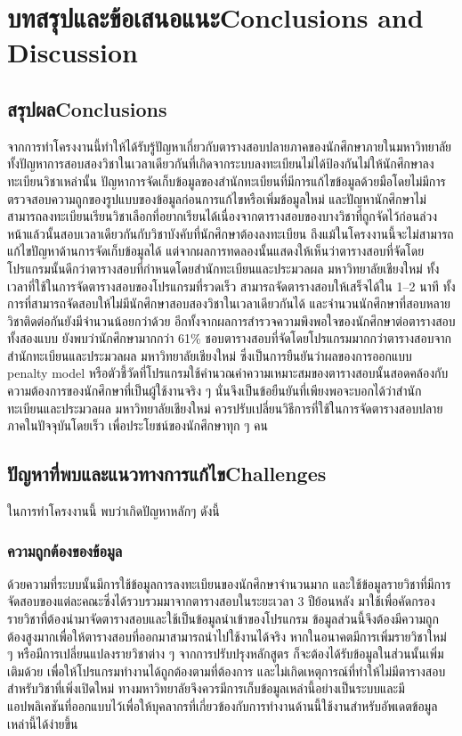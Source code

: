 \chapter{\ifcpe บทสรุปและข้อเสนอแนะ\else Conclusions and Discussion\fi}

\section{\ifcpe สรุปผล\else Conclusions\fi}

จากการทำโครงงานนี้ทำให้ได้รับรู้ปัญหาเกี่ยวกับตารางสอบปลายภาคของนักศึกษาภายในมหาวิทยาลัย
ทั้งปัญหาการสอบสองวิชาในเวลาเดียวกันที่เกิดจากระบบลงทะเบียนไม่ได้ป้องกันไม่ให้นักศึกษาลงทะเบียนวิชาเหล่านั้น
ปัญหาการจัดเก็บข้อมูลของสำนักทะเบียนที่มีการแก้ไขข้อมูลด้วยมือโดยไม่มีการตรวจสอบความถูกของรูปแบบของข้อมูลก่อนการแก้ไขหรือเพิ่มข้อมูลใหม่
และปัญหานักศึกษาไม่สามารถลงทะเบียนเรียนวิชาเลือกที่อยากเรียนได้เนื่องจากตารางสอบของบางวิชาที่ถูกจัดไว้ก่อนล่วงหน้าแล้วนั้นสอบเวลาเดียวกันกับวิชาบังคับที่นักศึกษาต้องลงทะเบียน
ถึงแม้ในโครงงานนี้จะไม่สามารถแก้ไขปัญหาด้านการจัดเก็บข้อมูลได้ แต่จากผลการทดลองนั้นแสดงให้เห็นว่าตารางสอบที่จัดโดยโปรแกรมนั้นดีกว่าตารางสอบที่กำหนดโดยสำนักทะเบียนและประมวลผล มหาวิทยาลัยเชียงใหม่
ทั้งเวลาที่ใช้ในการจัดตารางสอบของโปรแกรมที่รวดเร็ว สามารถจัดตารางสอบให้เสร็จได้ใน 1--2 นาที ทั้งการที่สามารถจัดสอบให้ไม่มีนักศึกษาสอบสองวิชาในเวลาเดียวกันได้
และจำนวนนักศึกษาที่สอบหลายวิชาติดต่อกันยังมีจำนวนน้อยกว่าด้วย อีกทั้งจากผลการสำรวจความพึงพอใจของนักศึกษาต่อตารางสอบทั้งสองแบบ ยังพบว่านักศึกษามากกว่า 61\%
ชอบตารางสอบที่จัดโดยโปรแกรมมากกว่าตารางสอบจากสำนักทะเบียนและประมวลผล มหาวิทยาลัยเชียงใหม่ ซึ่งเป็นการยืนยันว่าผลของการออกแบบ penalty model
หรือตัวชี้วัดที่โปรแกรมใช้คำนวณค่าความเหมาะสมของตารางสอบนั้นสอดคล้องกับความต้องการของนักศึกษาที่เป็นผู้ใช้งานจริง ๆ นั่นจึงเป็นข้อยืนยันที่เพียงพอจะบอกได้ว่าสำนักทะเบียนและประมวลผล มหาวิทยาลัยเชียงใหม่
ควรปรับเปลี่ยนวิธีการที่ใช้ในการจัดตารางสอบปลายภาคในปัจจุบันโดยเร็ว เพื่อประโยชน์ของนักศึกษาทุก ๆ คน

\section{\ifcpe ปัญหาที่พบและแนวทางการแก้ไข\else Challenges\fi}

ในการทำโครงงานนี้ พบว่าเกิดปัญหาหลักๆ ดังนี้
\subsection{ความถูกต้องของข้อมูล}
ด้วยความที่ระบบนั้นมีการใช้ข้อมูลการลงทะเบียนของนักศึกษาจำนวนมาก และใช้ข้อมูลรายวิชาที่มีการจัดสอบของแต่ละคณะซึ่งได้รวบรวมมาจากตารางสอบในระยะเวลา 3 ปีย้อนหลัง 
มาใช้เพื่อคัดกรองรายวิชาที่ต้องนำมาจัดตารางสอบและใช้เป็นข้อมูลนำเข้าของโปรแกรม ข้อมูลส่วนนี้จึงต้องมีความถูกต้องสูงมากเพื่อให้ตารางสอบที่ออกมาสามารถนำไปใช้งานได้จริง
หากในอนาคตมีการเพิ่มรายวิชาใหม่ ๆ หรือมีการเปลี่ยนแปลงรายวิชาต่าง ๆ จากการปรับปรุงหลักสูตร ก็จะต้องได้รับข้อมูลในส่วนนั้นเพิ่มเติมด้วย เพื่อให้โปรแกรมทำงานได้ถูกต้องตามที่ต้องการ
และไม่เกิดเหตุการณ์ที่ทำให้ไม่มีตารางสอบสำหรับวิชาที่เพิ่งเปิดใหม่ ทางมหาวิทยาลัยจึงควรมีการเก็บข้อมูลเหล่านี้อย่างเป็นระบบและมีแอปพลิเคชันที่ออกแบบไว้เพื่อให้บุคลากรที่เกี่ยวข้องกับการทำงานด้านนี้ใช้งานสำหรับอัพเดตข้อมูลเหล่านี้ได้ง่ายขึ้น

